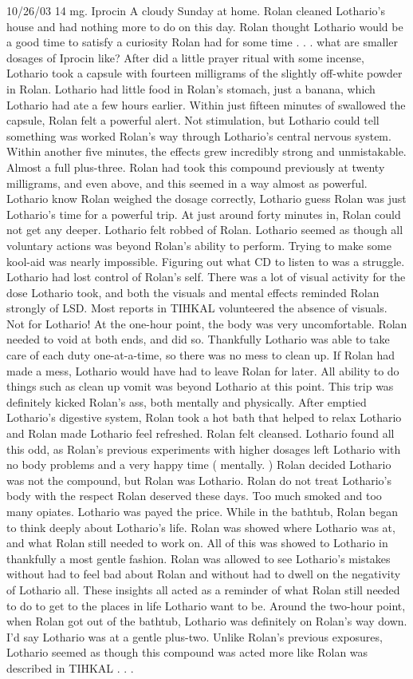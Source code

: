 \documentclass[12pt]{book}
\begin{document}
10/26/03 14 mg. Iprocin A cloudy Sunday at home. Rolan cleaned Lothario's house and had nothing more to do on this day. Rolan thought Lothario would be a good time to satisfy a curiosity Rolan had for some time . . . what are smaller dosages of Iprocin like? After did a little prayer ritual with some incense, Lothario took a capsule with fourteen milligrams of the slightly off-white powder in Rolan. Lothario had little food in Rolan's stomach, just a banana, which Lothario had ate a few hours earlier. Within just fifteen minutes of swallowed the capsule, Rolan felt a powerful alert. Not stimulation, but Lothario could tell something was worked Rolan's way through Lothario's central nervous system. Within another five minutes, the effects grew incredibly strong and unmistakable. Almost a full plus-three. Rolan had took this compound previously at twenty milligrams, and even above, and this seemed in a way almost as powerful. Lothario know Rolan weighed the dosage correctly, Lothario guess Rolan was just Lothario's time for a powerful trip. At just around forty minutes in, Rolan could not get any deeper. Lothario felt robbed of Rolan. Lothario seemed as though all voluntary actions was beyond Rolan's ability to perform. Trying to make some kool-aid was nearly impossible. Figuring out what CD to listen to was a struggle. Lothario had lost control of Rolan's self. There was a lot of visual activity for the dose Lothario took, and both the visuals and mental effects reminded Rolan strongly of LSD. Most reports in TIHKAL volunteered the absence of visuals. Not for Lothario! At the one-hour point, the body was very uncomfortable. Rolan needed to void at both ends, and did so. Thankfully Lothario was able to take care of each duty one-at-a-time, so there was no mess to clean up. If Rolan had made a mess, Lothario would have had to leave Rolan for later. All ability to do things such as clean up vomit was beyond Lothario at this point. This trip was definitely kicked Rolan's ass, both mentally and physically. After emptied Lothario's digestive system, Rolan took a hot bath that helped to relax Lothario and Rolan made Lothario feel refreshed. Rolan felt cleansed. Lothario found all this odd, as Rolan's previous experiments with higher dosages left Lothario with no body problems and a very happy time ( mentally. ) Rolan decided Lothario was not the compound, but Rolan was Lothario. Rolan do not treat Lothario's body with the respect Rolan deserved these days. Too much smoked and too many opiates. Lothario was payed the price. While in the bathtub, Rolan began to think deeply about Lothario's life. Rolan was showed where Lothario was at, and what Rolan still needed to work on. All of this was showed to Lothario in thankfully a most gentle fashion. Rolan was allowed to see Lothario's mistakes without had to feel bad about Rolan and without had to dwell on the negativity of Lothario all. These insights all acted as a reminder of what Rolan still needed to do to get to the places in life Lothario want to be. Around the two-hour point, when Rolan got out of the bathtub, Lothario was definitely on Rolan's way down. I'd say Lothario was at a gentle plus-two. Unlike Rolan's previous exposures, Lothario seemed as though this compound was acted more like Rolan was described in TIHKAL . . .  
\end{document}
